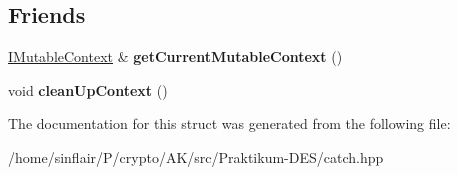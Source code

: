 \subsection*{Friends}
\begin{DoxyCompactItemize}
\item 
\mbox{\label{structCatch_1_1IMutableContext_aea4b25692aaf4397cdf630716976f6b8}} 
\hyperlink{structCatch_1_1IMutableContext}{I\+Mutable\+Context} \& {\bfseries get\+Current\+Mutable\+Context} ()
\item 
\mbox{\label{structCatch_1_1IMutableContext_ac07cdb7d744cc8f09672d924324b55fd}} 
void {\bfseries clean\+Up\+Context} ()
\end{DoxyCompactItemize}


The documentation for this struct was generated from the following file\+:\begin{DoxyCompactItemize}
\item 
/home/sinflair/\+P/crypto/\+A\+K/src/\+Praktikum-\/\+D\+E\+S/catch.\+hpp\end{DoxyCompactItemize}
